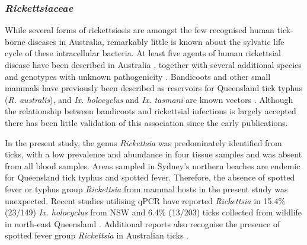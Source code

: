 \documentclass[a4paper, nobind]{templates/ociamthesis}
\begin{document}
\hypertarget{rickettsiaceae-1}{%
\subsubsection{\texorpdfstring{\emph{Rickettsiaceae}}{Rickettsiaceae}}\label{rickettsiaceae-1}}

While several forms of rickettsiosis are amongst the few recognised human tick-borne diseases in Australia, remarkably little is known about the sylvatic life cycle of these intracellular bacteria.
At least five agents of human rickettsial disease have been described in Australia \autocite{tadepalliMolecularEvidenceNovel2021}, together with several additional species and genotypes with unknown pathogenicity \autocite{vilcinsDetectionSpottedFever2008,vilcinsEvidencePresenceFrancisella2009,tadepalliMolecularEvidenceNovel2021}.
Bandicoots and other small mammals have previously been described as reservoirs for Queensland tick typhus (\emph{R. australis}), and \emph{Ix. holocyclus} and \emph{Ix. tasmani} are known vectors \autocite{campbellRickettsiosesAustraliaIsolation1974,sextonSpottedFeverGroup1991}.
Although the relationship between bandicoots and rickettsial infections is largely accepted there has been little validation of this association since the early publications.

In the present study, the genus \emph{Rickettsia} was predominately identified from ticks, with a low prevalence and abundance in four tissue samples and was absent from all blood samples.
Areas sampled in Sydney's northern beaches are endemic for Queensland tick typhus and spotted fever.
Therefore, the absence of spotted fever or typhus group \emph{Rickettsia} from mammal hosts in the present study was unexpected.
Recent studies utilising qPCR have reported \emph{Rickettsia} in 15.4\% (23/149) \emph{Ix. holocyclus} from NSW \autocite{gravesIxodesHolocyclusTicktransmitted2016} and 6.4\% (13/203) ticks collected from wildlife in north-east Queensland \autocite{hussain-yusufScreeningRickettsiaCoxiella2020}.
Additional reports also recognise the presence of spotted fever group \emph{Rickettsia} in Australian ticks \autocite{cookScrubTyphusOther1967,campbellRickettsiosesAustraliaIsolation1974,gravesRickettsiosesAustralia2006}.
\end{document}
